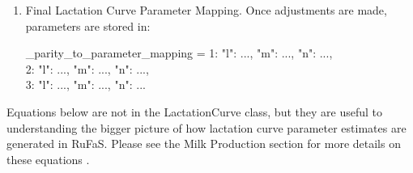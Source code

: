 \begin{refsection}
\begin{enumerate}
\begin{itemize}
            

        \begin{tcolorbox}[colback=white, colframe=black, boxrule=0.5pt, arc=3pt, width=\textwidth]
            118\% and 125\% are assumptions made based on the work by \textcite{Li2022}. 
        \end{tcolorbox}

            
            \item Fit l Parameter Using Optimization: (\_fit\_wood\_l\_param\_to\_milk\_yield). 
            The error function is defined as: (\_calculate\_305\_day\_milk\_yield\_error)
            \vspace{0.5cm}
            
            \begin{center}
                \(Error = Predicted\ MilkYield{305} - Target\ MilkYield{305} \)
            \end{center}
            \vspace{0.5cm}
            
            {\raggedleft \textbf{[AN.MLK.8]}\par}
            \vspace{0.5cm}
            
            Using Scipy's minimize function, the l parameter is iteratively adjusted to minimize this error.
        \end{itemize}
        
        \item Final Lactation Curve Parameter Mapping. Once adjustments are made, parameters are stored in:
        \vspace{0.5cm}
        
        \_parity\_to\_parameter\_mapping = {1: {"l": ..., "m": ..., "n": ...}, \\
                                            2: {"l": ..., "m": ..., "n": ...}, \\
                                            3: {"l": ..., "m": ..., "n": ...}}
                                            \vspace{0.2cm}


    \end{enumerate}

        
    Equations below are not in the LactationCurve class, but they are useful to understanding the bigger picture of how lactation curve parameter estimates are generated in RuFaS. Please see the Milk Production section for more details on these equations \parencite{Wood1967}.
    \vspace{0.5cm}


\end{refsection}

